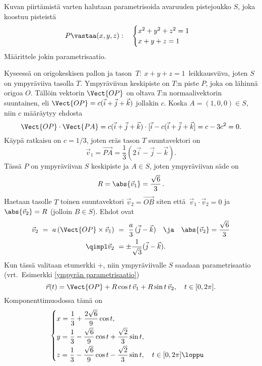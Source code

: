 \begin{Exa} Kuvan piirtämistä varten halutaan parametrisoida avaruuden pistejoukko $S$, joka 
koostuu pisteistä
\[
P \vastaa (x,y,z): \quad \begin{cases} x^2 + y^2 + z^2 = 1 \\ x+y+z = 1 \end{cases}
\]
Määrittele jokin parametrisaatio. 
\end{Exa}
\ratk Kyseessä on origokeskisen pallon ja tason $\,T:\ x+y+z = 1\,$ leikkausviiva, joten $S$ on
ympyräviiva tasolla $T$. Ympyräviivan keskipiste on $T$:n piste $P$, joka on lähinnä origoa $O$.
Tällöin vektorin $\Vect{OP}$ on oltava $T$:n normaalivektorin suuntainen, eli 
$\Vect{OP} = c(\vec{i}+\vec{j}+\vec{k})$ jollakin $c$. Koska $A = (1,0,0) \in S$, niin $c$ 
määräytyy ehdosta
\[ 
\Vect{OP} \cdot \Vect{PA} 
     = c(\vec{i}+\vec{j}+\vec{k}) \cdot [\vec{i}-c(\vec{i}+\vec{j}+\vec{k}] = c-3c^2 = 0. 
\]
Käypä ratkaisu on $c=1/3$, joten eräs tason $T$ suuntavektori on
\[ 
\vec{v}_1 = \overrightarrow{PA} = \frac{1}{3}(2\vec{i}-\vec{j}-\vec{k}). 
\]
Tässä $P$ on ympyräviivan $S$ keskipiste ja $A \in S$, joten ympyräviivan säde on
\[ 
R = \abs{\vec{v}_1} = \frac{\sqrt{6}}{3}\,. 
\]
Haetaan tasolle $T$ toinen suuntavektori $\vec{v}_2 = \overrightarrow{OB}$ siten että 
$\,\vec{v}_1 \cdot \vec{v}_2 = 0$ ja $\abs{\vec{v}_2}=R$ (jolloin $B \in S$). Ehdot ovat
\begin{align*}
\vec{v}_2\ =\ a\,(\Vect{OP} \times \vec{v}_1)\ 
                  &=\ \dfrac{a}{3}\,(\vec{j}-\vec{k}) \quad \ja \quad \abs{\vec{v}_2} 
                        = \dfrac{\sqrt{6}}{3}\\
\qimpl \vec{v}_2\ &= \pm \dfrac{1}{\sqrt{3}}(\vec{j}-\vec{k}).
\end{align*}
Kun tässä valitaan etumerkki $+$, niin ympyräviivalle $S$ saadaan parametrisaatio 
(vrt.\ Esimerkki \ref{ympyrän parametrisaatio})
\[ 
\vec{r}(t) = \Vect{OP} + R\cos t\,\vec{v}_1 + R\sin t\,\vec{v}_2, \quad t \in [0,2\pi]. 
\]
Komponenttimuodossa tämä on
\[ \begin{cases}
x = \dfrac{1}{3} + \dfrac{2\sqrt{6}}{9} \cos t, \\[2mm]
y = \dfrac{1}{3} - \dfrac{\sqrt{6}}{9} \cos t + \dfrac{\sqrt{2}}{3} \sin t, \\[2mm]
z = \dfrac{1}{3} - \dfrac{\sqrt{6}}{9} \cos t - \dfrac{\sqrt{2}}{3} \sin t, 
                                                           \quad t \in [0,2\pi] \loppu
\end{cases} \]